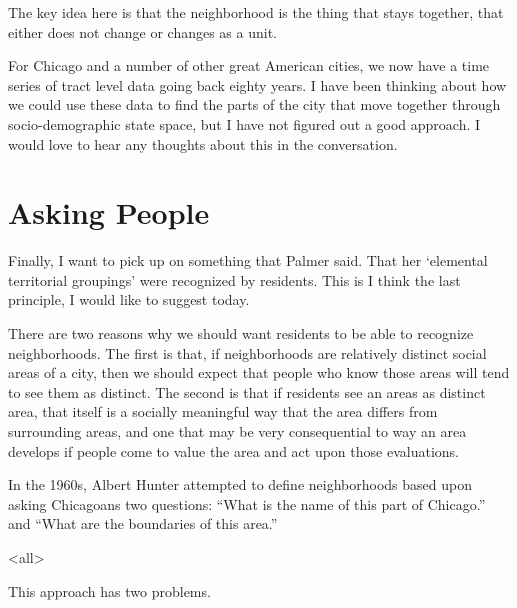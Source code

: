{The key idea here is that the neighborhood is the thing that stays
together, that either does not change or changes as a unit.

\begin{figure}[h!]
\centering
{}
\end{figure}

For Chicago and a number of other great American cities, we now have a
time series of tract level data going back eighty years. I have been
thinking about how we could use these data to find the parts of the
city that move together through socio-demographic state space, but I
have not figured out a good approach. I would love to hear any
thoughts about this in the conversation.

\section{Asking People}

Finally, I want to pick up on something that Palmer said. That her
`elemental territorial groupings' were recognized by residents. This
is I think the last principle, I would like to suggest today.

\begin{figure}[h!]
\centering
{}
\end{figure}

There are two reasons why we should want residents to be able to
recognize neighborhoods. The first is that, if neighborhoods are
relatively distinct social areas of a city, then we should expect that
people who know those areas will tend to see them as distinct. The
second is that if residents see an areas as distinct area, that itself
is a socially meaningful way that the area differs from surrounding
areas, and one that may be very consequential to way an area develops
if people come to value the area and act upon those evaluations.

In the 1960s, Albert Hunter attempted to define neighborhoods based
upon asking Chicagoans two questions: ``What is the name of this part
of Chicago.'' and ``What are the boundaries of this area.''

\mode<all>{
}

This approach has two problems. 

}
